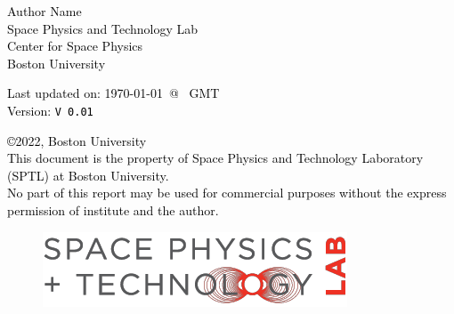 \begin{titlepage}
    \begin{flushright}
        \Large{
        \textcolor{black}{Author Name}\\
        \textcolor{black}{Space Physics and Technology Lab}\\
        \textcolor{black}{Center for Space Physics}\\
        \textcolor{black}{Boston University}\\
        }
    \end{flushright}
    \vspace{7em}
    \begin{center}
        \vfill
        \textcolor{black}{Last updated on: \today ~@ \currenttime ~GMT}\\
        \textcolor{black}{Version: \texttt{V 0.01}}
    \end{center}
    \vfill
    \noindent

    \newpage\thispagestyle{empty}\addtocounter{page}{-1}
    \nopagecolor%
    \vspace*{\fill}
    \begin{center}
        \textcolor{black}{\copyright{2022, Boston University}\\
        This document is the property of Space Physics and Technology Laboratory (SPTL) at Boston
        University.\\
        No part of this report may be used for commercial purposes without the express permission of
        institute and the author.}\\
    \end{center}
    \vspace*{\fill}
    \begin{figure}[b]
        \centering
            {
                \includegraphics[height=0.125\textheight]{images/sptl_v2.png}
            }%
    \end{figure}
     \newpage
\end{titlepage}